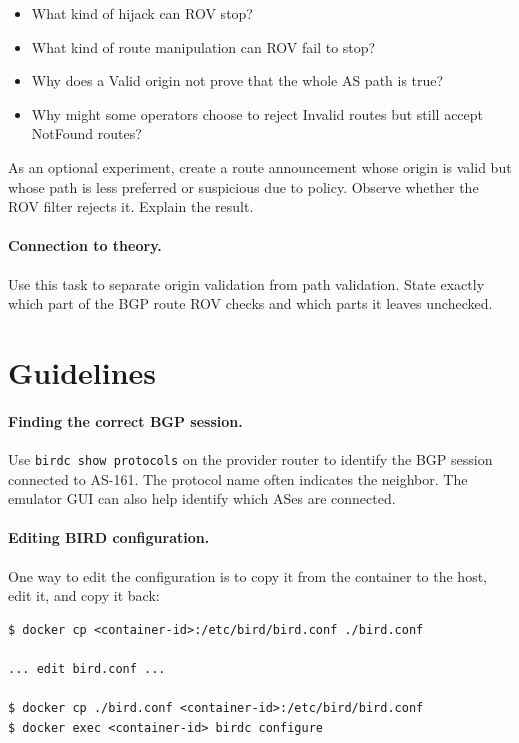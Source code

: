 \begin{itemize}[noitemsep]
\item What kind of hijack can ROV stop?
\item What kind of route manipulation can ROV fail to stop?
\item Why does a Valid origin not prove that the whole AS path is true?
\item Why might some operators choose to reject Invalid routes but still accept
      NotFound routes?
\end{itemize}

As an optional experiment, create a route announcement whose origin is valid but
whose path is less preferred or suspicious due to policy. Observe whether the
ROV filter rejects it. Explain the result.

\paragraph{Connection to theory.}
Use this task to separate origin validation from path validation. State exactly
which part of the BGP route ROV checks and which parts it leaves unchecked.


\section{Guidelines}

\paragraph{Finding the correct BGP session.}
Use \texttt{birdc show protocols} on the provider router to identify the BGP
session connected to AS-161. The protocol name often indicates the neighbor.
The emulator GUI can also help identify which ASes are connected.

\paragraph{Editing BIRD configuration.}
One way to edit the configuration is to copy it from the container to the host,
edit it, and copy it back:

\begin{lstlisting}
$ docker cp <container-id>:/etc/bird/bird.conf ./bird.conf

... edit bird.conf ...

$ docker cp ./bird.conf <container-id>:/etc/bird/bird.conf
$ docker exec <container-id> birdc configure
\end{lstlisting}

